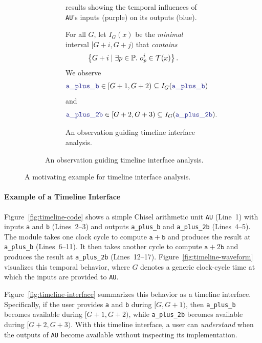 \begin{figure}[tp]
\begin{subfigure}[b]{.5\textwidth}
        \vspace{1ex}

        \begin{subfigure}{\linewidth}
            \centering
            
            \caption{\tia results showing the temporal influences of \texttt{AU}'s inputs (purple) on its outputs (blue).}
            \label{fig:tia-timeline}
        \end{subfigure}

        \vspace{1ex}

        \begin{subfigure}{\linewidth}
            For all $G$, let $I_G(x)$ be the \emph{minimal} interval $[G+i, G+j)$ that \emph{contains}
            \[
            \left\{G + i \mid \exists p \in \mathbb{P}.\ o_p^i \in \mathcal{T}(x)\right\}.
            \]
            We observe
            \[
            \textblue{\mathtt{a\_plus\_b}} \in [G + 1, G + 2) \subseteq I_G(\textblue{\mathtt{a\_plus\_b}})
            \]
            and
            \[
            \textblue{\mathtt{a\_plus\_2b}} \in [G + 2, G + 3) \subseteq I_G(\textblue{\mathtt{a\_plus\_2b}}).
            \]
            \caption{An observation guiding timeline interface analysis.}
            \label{fig:timeline-observe}
        \end{subfigure}
    \end{subfigure}
    \hfill
    \caption{A motivating example for timeline interface analysis.}
\end{figure}

\paragraph{Example of a Timeline Interface}

Figure~\ref{fig:timeline-code} shows a simple Chisel arithmetic unit \texttt{AU} (Line~1) with inputs \texttt{a} and \texttt{b} (Lines~2--3) and outputs \texttt{a\_plus\_b} and \texttt{a\_plus\_2b} (Lines~4--5).
The module takes one clock cycle to compute $\mathtt{a}+\mathtt{b}$ and produces the result at \texttt{a\_plus\_b} (Lines~6--11).
It then takes another cycle to compute $\mathtt{a}+2\mathtt{b}$ and produces the result at \texttt{a\_plus\_2b} (Lines~12--17).
Figure~\ref{fig:timeline-waveform} visualizes this temporal behavior, where $G$ denotes a generic clock-cycle time at which the inputs are provided to \texttt{AU}.

Figure~\ref{fig:timeline-interface} summarizes this behavior as a timeline interface.
Specifically, if the user provides \texttt{a} and \texttt{b} during $[G,G+1)$, then \texttt{a\_plus\_b} becomes available during $[G+1,G+2)$, while \texttt{a\_plus\_2b} becomes available during $[G+2,G+3)$.
With this timeline interface, a user can \emph{understand} when the outputs of \texttt{AU} become available without inspecting its implementation.

